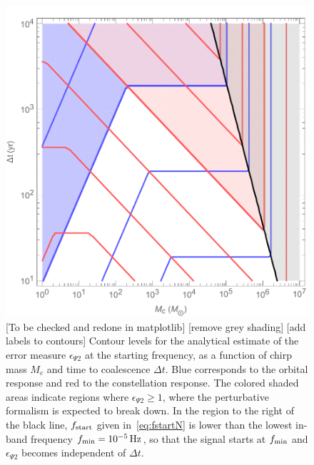 \documentclass[aps,showpacs,twocolumn,
prd,superscriptaddress,nofootinbib]{revtex4-1}
\newcommand{\Hz}{\,\mathrm{Hz}}
\newcommand{\Mchirp}{M_{c}}
\newcommand{\SM}[1]{{\color{Red} #1}}
\begin{document}
\begin{figure}
  \centering
  \includegraphics[width=.9\linewidth]{plots/lisafom_Psi_McDeltat.pdf}
  \caption{\SM{[To be checked and redone in matplotlib]} \SM{[remove grey shading]} \SM{[add labels to contours]} Contour levels for the analytical estimate of the error measure $\epsilon_{\Psi 2}$ at the starting frequency, as a function of chirp mass $\Mchirp$ and time to coalescence $\Delta t$. Blue corresponds to the orbital response and red to the constellation response. The colored shaded areas indicate regions where $\epsilon_{\Psi 2} \geq 1$, where the perturbative formalism is expected to break down. In the region to the right of the black line, $f_{\rm start}$ given in~\eqref{eq:fstartN} is lower than the lowest in-band frequency $f_{\rm min} = 10^{-5}\Hz$, so that the signal starts at $f_{\rm min}$ and $\epsilon_{\Psi 2}$ becomes independent of $\Delta t$.}
  \label{fig:lisafomPsiMcDeltat}
\end{figure}
\end{document}

